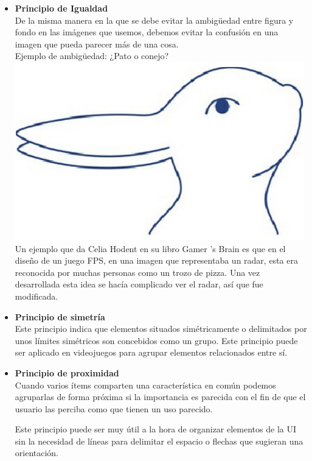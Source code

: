 \begin{itemize}
\item \textbf{Principio de Igualdad} \\
De  la misma manera en la que se debe evitar la ambigüedad entre figura y fondo en las imágenes que usemos, debemos evitar la confusión en una imagen que pueda parecer más de una cosa.\\

Ejemplo de ambigüedad: ¿Pato o conejo?\\
\includegraphics[width=\textwidth]{Imagenes/EjemploIgualdad.png}
Un ejemplo que da Celia Hodent en su libro Gamer 's Brain es que en el diseño de un juego FPS, en una imagen que representaba un radar, esta era reconocida por muchas personas como un trozo de pizza. Una vez desarrollada esta idea se hacía complicado ver el radar, así que fue modificada.

\item \textbf{Principio de simetría} \\
Este principio indica que elementos situados simétricamente o delimitados por unos límites simétricos son concebidos como un grupo.
Este principio puede ser aplicado en videojuegos para agrupar elementos relacionados entre sí.

\item \textbf{Principio de proximidad} \\
Cuando varios ítems comparten una característica en común podemos agruparlas de forma próxima si la importancia es parecida  con el fin de que el usuario las perciba como que tienen un uso parecido.

Este principio puede ser muy útil a la hora de organizar elementos de la UI sin la necesidad de líneas para delimitar el espacio o flechas que sugieran una orientación.


\end{itemize}
